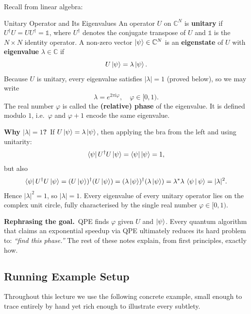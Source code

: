 \documentclass[12pt,a4paper]{article}
\newcommand{\C}{\mathbb{C}}
\newcommand{\Id}{\mathbb{1}}
\newcommand{\QPE}{\textsc{QPE}}
\newcommand{\ii}{\mathrm{i}}
\begin{document}
Recall from linear algebra:

\begin{definition}{Unitary Operator and Its Eigenvalues}{}
  An operator $U$ on $\C^N$ is \textbf{unitary} if
  $U^\dagger U = U U^\dagger = \Id$, where $U^\dagger$ denotes the conjugate
  transpose of $U$ and $\Id$ is the $N\times N$ identity operator.
  A non-zero vector $\Ket{\psi} \in \C^N$ is an \textbf{eigenstate} of $U$
  with \textbf{eigenvalue} $\lambda \in \C$ if
  \[
    U\Ket{\psi} = \lambda \Ket{\psi}.
  \]
  Because $U$ is unitary, every eigenvalue satisfies $|\lambda| = 1$
  (proved below), so we may write
  \[
    \lambda = e^{2\pi \ii \varphi}, \quad \varphi \in [0,1).
  \]
  The real number $\varphi$ is called the \textbf{(relative) phase} of the eigenvalue.
  It is defined modulo $1$, i.e.\ $\varphi$ and $\varphi + 1$ encode the same eigenvalue.
\end{definition}

\medskip

\textbf{Why $|\lambda|=1$?}\ If $U\Ket{\psi}=\lambda\Ket{\psi}$, then
applying the bra from the left and using unitarity:
\[
  \Bra{\psi}U^\dagger U\Ket{\psi} = \Bra{\psi}\Ket{\psi} = 1,
\]
but also
\[
  \Bra{\psi}U^\dagger U\Ket{\psi}
  = (U\Ket{\psi})^\dagger(U\Ket{\psi})
  = (\lambda\Ket{\psi})^\dagger(\lambda\Ket{\psi})
  = \lambda^*\lambda\,\Braket{\psi|\psi}
  = |\lambda|^2.
\]
Hence $|\lambda|^2 = 1$, so $|\lambda| = 1$.  Every eigenvalue of every
unitary operator lies on the complex unit circle, fully characterised by
the single real number $\varphi \in [0,1)$.

\begin{tcolorbox}[insight]
  \textbf{Rephrasing the goal.}\ \QPE{} finds $\varphi$ given $U$ and
  $\Ket{\psi}$.  Every quantum algorithm that claims an exponential speedup
  via \QPE{} ultimately reduces its hard problem to: \emph{``find this phase.''}
  The rest of these notes explain, from first principles, exactly how.
\end{tcolorbox}

\subsection{Running Example Setup}
\label{subsec:running}

Throughout this lecture we use the following concrete example, small enough
to trace entirely by hand yet rich enough to illustrate every subtlety.
\end{document}
